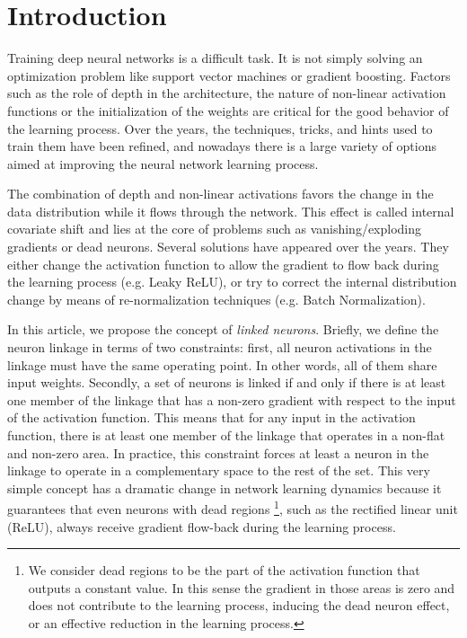 \documentclass[10pt,twocolumn,letterpaper]{article}
\begin{document}
\section{Introduction}

Training deep neural networks is a difficult task. It is not simply solving an optimization problem like support vector machines or gradient boosting. Factors such as the role of depth in the architecture, the nature of non-linear activation functions or the initialization of the weights are critical for the good behavior of the learning process. Over the years, the techniques, tricks, and hints used to train them have been refined, and nowadays there is a large variety of options aimed at improving the neural network learning process. 

The combination of depth and non-linear activations favors the change in the data distribution while it flows through the network. This effect is called internal covariate shift \cite{batchnorm} and lies at the core of problems such as vanishing/exploding gradients or dead neurons. Several solutions have appeared over the years. They either change the activation function to allow the gradient to flow back during the learning process (e.g. Leaky ReLU), or try to correct the internal distribution change by means of re-normalization techniques (e.g. Batch Normalization).

In this article, we propose the concept of {\it linked neurons}. Briefly, we define the neuron linkage in terms of two constraints: first, all neuron activations in the linkage must have the same operating point. In other words, all of them share input weights. Secondly, a set of neurons is linked if and only if there is at least one member of the linkage that has a non-zero gradient with respect to the input of the activation function. This means that for any input in the activation function, there is at least one member of the linkage that operates in a non-flat and non-zero area. In practice, this constraint forces at least a neuron in the linkage to operate in a complementary space to the rest of the set. This very simple concept has a dramatic change in network learning dynamics because it guarantees that even neurons with dead regions \footnote{We consider dead regions to be the part of the activation function that outputs a constant value. In this sense the gradient in those areas is zero and does not contribute to the learning process, inducing the dead neuron effect, or an effective reduction in the learning process.}, such as the rectified linear unit (ReLU), always receive gradient flow-back during the learning process. 
\end{document}
